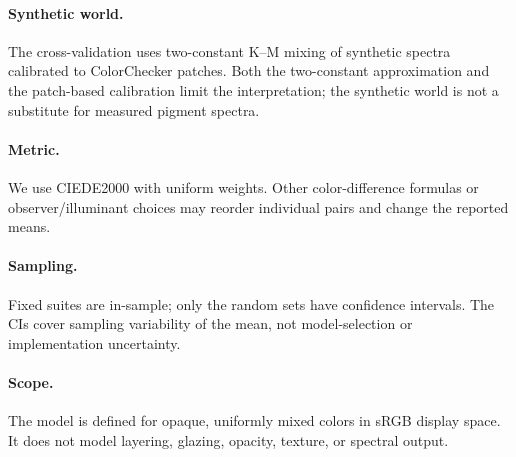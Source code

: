 \paragraph{Synthetic world.}
The cross-validation uses two-constant K--M mixing of synthetic spectra calibrated to ColorChecker patches. Both the two-constant approximation and the patch-based calibration limit the interpretation; the synthetic world is not a substitute for measured pigment spectra.

\paragraph{Metric.}
We use CIEDE2000 with uniform weights. Other color-difference formulas or observer/illuminant choices may reorder individual pairs and change the reported means.

\paragraph{Sampling.}
Fixed suites are in-sample; only the random sets have confidence intervals. The CIs cover sampling variability of the mean, not model-selection or implementation uncertainty.

\paragraph{Scope.}
The model is defined for opaque, uniformly mixed colors in sRGB display space. It does not model layering, glazing, opacity, texture, or spectral output.
